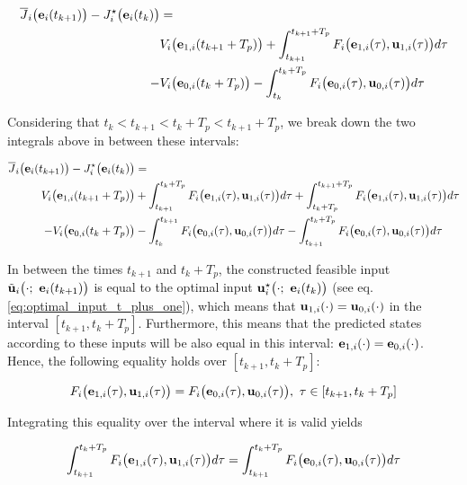\begin{align}
  \overline{J}_i\big(\bm{\mathbf{e}}_i(t_{k+1})\big) - J_i^{\star}\big(\bm{\mathbf{e}}_i(t_k)\big) &= \\
   & V_i \big(\bm{\mathbf{e}}_{1,i} (t_{k+1} + T_p)\big) + \int_{t_{k+1}}^{t_{k+1} + T_p} F_i \big(\bm{\mathbf{e}}_{1,i}(\tau), \bm{\mathbf{u}}_{1,i} (\tau)\big) d \tau \\
  -&V_i \big(\bm{\mathbf{e}}_{0,i} (t_k + T_p)\big) - \int_{t_k}^{t_k + T_p} F_i \big(\bm{\mathbf{e}}_{0,i}(\tau), \bm{\mathbf{u}}_{0,i} (\tau)\big) d \tau
\end{align}

Considering that $t_k < t_{k+1} < t_k + T_p < t_{k+1} + T_p$, we break down the
two integrals above in between these intervals:

\begin{align}
  \overline{J}_i\big(\bm{\mathbf{e}}_i(t_{k+1})\big) - J_i^{\star}\big(\bm{\mathbf{e}}_i(t_k)\big) &= \\
    V_i \big(\bm{\mathbf{e}}_{1,i} (t_{k+1} + T_p)\big)
    &+ \int_{t_{k+1}}^{t_k + T_p} F_i \big(\bm{\mathbf{e}}_{1,i}(\tau), \bm{\mathbf{u}}_{1,i} (\tau)\big) d \tau
    + \int_{t_k + T_p}^{t_{k+1} + T_p} F_i \big(\bm{\mathbf{e}}_{1,i}(\tau), \bm{\mathbf{u}}_{1,i} (\tau)\big) d \tau \\
    -V_i \big(\bm{\mathbf{e}}_{0,i} (t_k + T_p)\big)
    &- \int_{t_k}^{t_{k+1}} F_i \big(\bm{\mathbf{e}}_{0,i}(\tau), \bm{\mathbf{u}}_{0,i} (\tau)\big) d \tau
    - \int_{t_{k+1}}^{t_k + T_p} F_i \big(\bm{\mathbf{e}}_{0,i}(\tau), \bm{\mathbf{u}}_{0,i} (\tau)\big) d \tau
\label{eq:convergence_4_integrals}
\end{align}

\begin{gg_box}
In between the times $t_{k+1}$ and $t_k + T_p$, the constructed feasible input
$\tilde{\vect{u}}_i\big(\cdot;\ \vect{e}_i(t_{k+1})\big)$ is equal to the optimal
input $\vect{u}_i^{\star}\big(\cdot;\ \vect{e}_i(t_k)\big)$
(see eq. \ref{eq:optimal_input_t_plus_one}), which means that
$\bm{\mathbf{u}}_{1,i}(\cdot) = \bm{\mathbf{u}}_{0,i}(\cdot)$ in the interval $[t_{k+1}, t_k + T_p]$.
Furthermore, this means that the predicted states according to these inputs will
be also equal in this interval: $\bm{\mathbf{e}}_{1,i}(\cdot) = \bm{\mathbf{e}}_{0,i}(\cdot)$.
Hence, the following equality holds over $[t_{k+1}, t_k + T_p]$:

\begin{align}
  F_i \big(\bm{\mathbf{e}}_{1,i}(\tau), \bm{\mathbf{u}}_{1,i} (\tau)\big) =
  F_i \big(\bm{\mathbf{e}}_{0,i}(\tau), \bm{\mathbf{u}}_{0,i} (\tau)\big),\ \tau \in [t_{k+1}, t_k + T_p]
\end{align}

Integrating this equality over the interval where it is valid yields

\begin{align}
  \int_{t_{k+1}}^{t_k + T_p}F_i \big(\bm{\mathbf{e}}_{1,i}(\tau), \bm{\mathbf{u}}_{1,i} (\tau)\big) d\tau =
  \int_{t_{k+1}}^{t_k + T_p}F_i \big(\bm{\mathbf{e}}_{0,i}(\tau), \bm{\mathbf{u}}_{0,i} (\tau)\big) d\tau
\end{align}

\end{gg_box}

